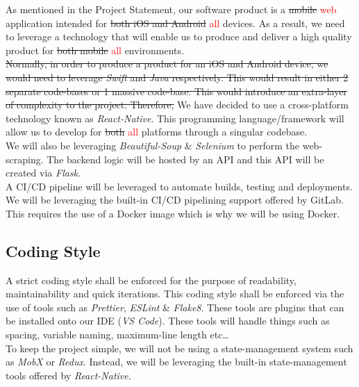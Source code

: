 \documentclass[11pt, oneside]{article}   	%
\begin{document}
As mentioned in the Project Statement, our software product is a \sout{mobile} \textcolor{red}{web} application intended for \sout{both iOS and Android} \textcolor{red}{all} devices. As a result, we need to leverage a technology that will enable us to produce and deliver a high quality product for \sout{both mobile} \textcolor{red}{all} environments. \\

\sout{Normally, in order to produce a product for an iOS and Android device, we would need to leverage {\it Swift} and {\it Java} respectively. This would result in either 2 separate code-bases or 1 massive code-base. This would introduce an extra-layer of complexity to the project. Therefore,} We have decided to use a cross-platform technology known as {\it React-Native}. This programming language/framework will allow us to develop for \sout{both} \textcolor{red}{all} platforms through a singular codebase. \\

We will also be leveraging {\it Beautiful-Soup} \& {\it Selenium} to perform the web-scraping. The backend logic will be hosted by an API and this API will be created via {\it Flask}. \\

A CI/CD pipeline will be leveraged to automate builds, testing and deployments. We will be leveraging the built-in CI/CD pipelining support offered by GitLab. This requires the use of a Docker image which is why we will be using Docker. \\

\newpage
\subsection*{Coding Style}

A strict coding style shall be enforced for the purpose of readability, maintainability and quick iterations. This coding style shall be enforced via the use of tools such as {\it Prettier}, {\it ESLint} \& {\it Flake8}. These tools are plugins that can be installed onto our IDE ({\it VS Code}). These tools will handle things such as spacing, variable naming, maximum-line length etc…\\

To keep the project simple, we will not be using a state-management system such as {\it MobX} or {\it Redux}. Instead, we will be leveraging the built-in state-management tools offered by {\it React-Native}.
\end{document}
